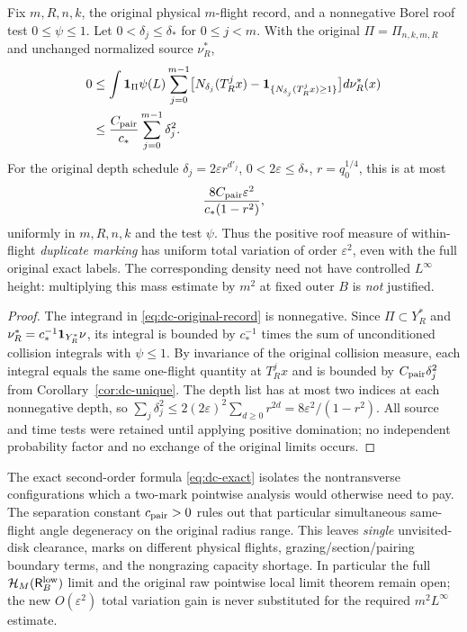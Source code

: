\begin{corollary}
\label{cor:dc-schedule}
Fix $m,R,n,k$, the original physical $m$-flight record, and a
nonnegative Borel roof test $0\le\psi\le1$.  Let
$0<\delta_j\le\delta_*$ for $0\le j<m$.  With the original
$\Pi=\Pi_{n,k,m,R}$ and unchanged normalized source $\nu_R^*$,
\begin{align}\label{eq:dc-original-record}
 0&\le\int\mathbf1_{\Pi}\psi(L)
  \sum_{j=0}^{m-1}\bigl[
       N_{\delta_j}(T_R^jx)
     -\mathbf1_{\{N_{\delta_j}(T_R^jx)\ge1\}}
                   \bigr]d\nu_R^*(x)\\
 &\le\frac{C_{\rm pair}}{c_*}
             \sum_{j=0}^{m-1}\delta_j^2.\notag
\end{align}
For the original depth schedule
$\delta_j=2\varepsilon r^{d'_j}$,
$0<2\varepsilon\le\delta_*$, $r=q_0^{1/4}$,
this is at most
\begin{equation}\label{eq:dc-scheduled}
        \frac{8C_{\rm pair}\varepsilon^2}
                        {c_*(1-r^2)},
\end{equation}
uniformly in $m,R,n,k$ and the test $\psi$.  Thus the positive
roof measure of within-flight \emph{duplicate marking} has
uniform total variation of order $\varepsilon^2$, even with the
full original exact labels.  The corresponding density need not
have controlled $L^\infty$ height: multiplying this mass estimate
by $m^2$ at fixed outer $B$ is \emph{not} justified.
\end{corollary}
\begin{proof}
The integrand in \eqref{eq:dc-original-record} is nonnegative.
Since $\Pi\subset Y_R^*$ and $\nu_R^*=c_*^{-1}\mathbf1_{Y_R^*}\nu$,
its integral is bounded by $c_*^{-1}$ times the sum of unconditioned
collision integrals with $\psi\le1$.  By invariance of the original
collision measure, each integral equals the same one-flight
quantity at $T_R^jx$ and is bounded by
$C_{\rm pair}\delta_j^2$ from
Corollary~\ref{cor:dc-unique}.  The depth list has at most two
indices at each nonnegative depth, so
$\sum_j\delta_j^2\le
2(2\varepsilon)^2\sum_{d\ge0}r^{2d}
=8\varepsilon^2/(1-r^2)$.  All source and time tests were
retained until applying positive domination; no independent
probability factor and no exchange of the original limits occurs.
\end{proof}

The exact second-order formula \eqref{eq:dc-exact} isolates the
nontransverse configurations which a two-mark pointwise analysis
would otherwise need to pay.  The separation constant
$c_{\rm pair}>0$ rules out that particular simultaneous same-flight
angle degeneracy on the original radius range.  This leaves
\emph{single} unvisited-disk clearance, marks on different
physical flights, grazing/section/pairing boundary terms, and the
nongrazing capacity shortage.  In particular the full
$\mathcal H_M(\mathsf R_B^{\rm low})$ limit and the original raw
pointwise local limit theorem remain open; the new $O(\varepsilon^2)$
total variation gain is never substituted for the required
$m^2L^\infty$ estimate.
